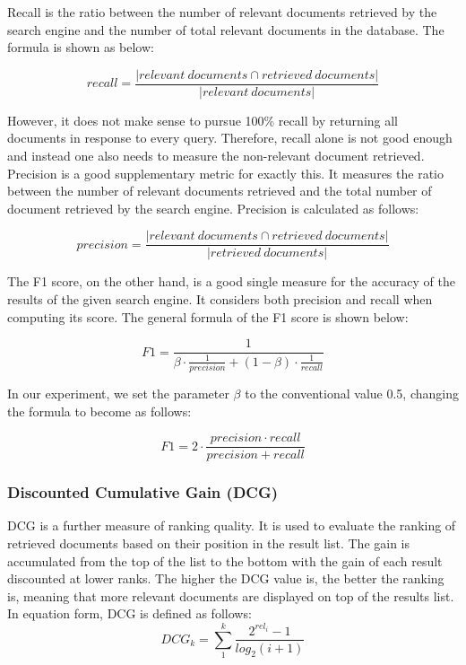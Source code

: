 Recall is the ratio between the number of relevant documents retrieved by the search engine and the number of total relevant documents in the database. The formula is shown as below: 

\[recall=\frac{|relevant\ documents\cap retrieved\ documents|}{|relevant\ documents|}\]

However, it does not make sense to pursue 100\% recall by returning all documents in response to every query. Therefore, recall alone is not good enough and instead one also needs to measure the non-relevant document retrieved. Precision is a good supplementary metric for exactly this. It measures the ratio between the number of relevant documents retrieved and the total number of document retrieved by the search engine. Precision is calculated as follows:

\[precision=\frac{|relevant\ documents\cap retrieved\ documents|}{| retrieved\ documents |}\]

The F1 score, on the other hand, is a good single measure for the accuracy of the results of the given search engine. It considers both precision and recall when computing its score. The general formula of the F1 score is shown below:

\[F1=\frac{1}{\beta \cdot \frac{1}{precision}+(1-\beta)\cdot \frac{1}{recall}}\]

In our experiment, we set the parameter $\beta$ to the conventional value 0.5, changing the formula to become as follows:

\[F1=2\cdot \frac{precision \cdot recall}{precision+recall}\]

\subsubsection{Discounted Cumulative Gain (DCG)}

DCG is a further measure of ranking quality. It is used to evaluate the ranking of retrieved documents based on their position in the result list. The gain is accumulated from the top of the list to the bottom with the gain of each result discounted at lower ranks. The higher the DCG value is, the better the ranking is, meaning that more relevant documents are displayed on top of the results list. In equation form, DCG is defined as follows:
\[DCG_{k}=\sum_1^k \frac{2^{rel_{i}}-1}{log_{2}(i+1)}\]


